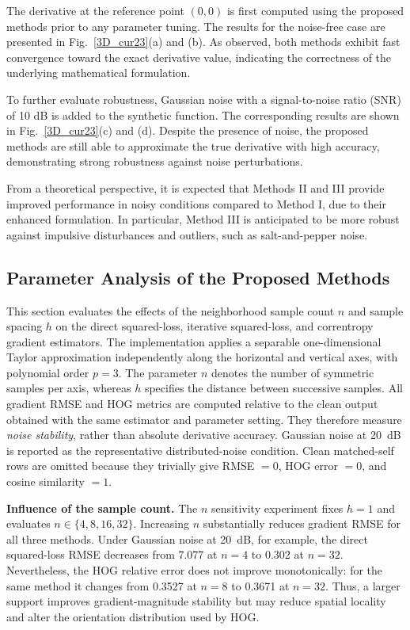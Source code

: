\documentclass{elsarticle}
\begin{document}
The derivative at the reference point $(0,0)$ is first computed using the proposed methods prior to any parameter tuning. The results for the noise-free case are presented in Fig.~\ref{3D_cur23}(a) and (b). As observed, both methods exhibit fast convergence toward the exact derivative value, indicating the correctness of the underlying mathematical formulation.
\FloatBarrier

To further evaluate robustness, Gaussian noise with a signal-to-noise ratio (SNR) of 10 dB is added to the synthetic function. The corresponding results are shown in Fig.~\ref{3D_cur23}(c) and (d). Despite the presence of noise, the proposed methods are still able to approximate the true derivative with high accuracy, demonstrating strong robustness against noise perturbations.

From a theoretical perspective, it is expected that Methods II and III provide improved performance in noisy conditions compared to Method I, due to their enhanced formulation. In particular, Method III is anticipated to be more robust against impulsive disturbances and outliers, such as salt-and-pepper noise.

\FloatBarrier
\subsection{Parameter Analysis of the Proposed Methods}

This section evaluates the effects of the neighborhood sample count $n$ and
sample spacing $h$ on the direct squared-loss, iterative squared-loss, and
correntropy gradient estimators. The implementation applies a separable
one-dimensional Taylor approximation independently along the horizontal and
vertical axes, with polynomial order $p=3$. The parameter $n$ denotes the
number of symmetric samples per axis, whereas $h$ specifies the distance
between successive samples. All gradient RMSE and HOG metrics are computed
relative to the clean output obtained with the same estimator and parameter
setting. They therefore measure \emph{noise stability}, rather than absolute
derivative accuracy. Gaussian noise at 20~dB is reported as the
representative distributed-noise condition. Clean matched-self rows are
omitted because they trivially give RMSE $=0$, HOG error $=0$, and cosine
similarity $=1$.

\textbf{Influence of the sample count.}
The $n$ sensitivity experiment fixes $h=1$ and evaluates
$n\in\{4,8,16,32\}$. Increasing $n$ substantially reduces gradient RMSE for
all three methods. Under Gaussian noise at 20~dB, for example, the direct
squared-loss RMSE decreases from 7.077 at $n=4$ to 0.302 at $n=32$.
Nevertheless, the HOG relative error does not improve monotonically: for the
same method it changes from 0.3527 at $n=8$ to 0.3671 at $n=32$. Thus, a
larger support improves gradient-magnitude stability but may reduce spatial
locality and alter the orientation distribution used by HOG.
\end{document}
